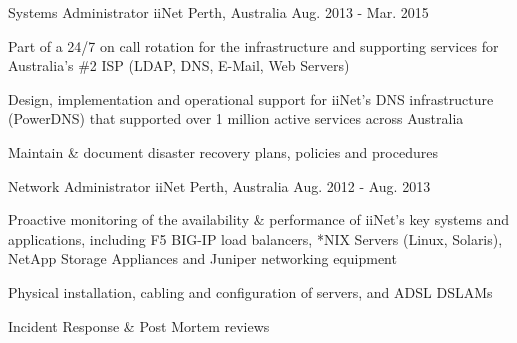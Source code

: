 \begin{cventries}
  \cventry
    {Systems Administrator} %
    {iiNet} %
    {Perth, Australia} %
    {Aug. 2013 - Mar. 2015} %
    {
      \begin{cvitems} %
        \item {Part of a 24/7 on call rotation for the infrastructure and supporting services for Australia's \#2 ISP (LDAP, DNS, E-Mail, Web Servers)}
        \item {Design, implementation and operational support for iiNet's DNS infrastructure (PowerDNS) that supported over 1 million active services across Australia}
        \item {Maintain \& document disaster recovery plans, policies and procedures}
      \end{cvitems}
    }

  \cventry
    {Network Administrator} %
    {iiNet} %
    {Perth, Australia} %
    {Aug. 2012 - Aug. 2013} %
    {
      \begin{cvitems} %
        \item {Proactive monitoring of the availability \& performance of iiNet’s key systems and applications, including F5 BIG-IP load balancers, *NIX Servers (Linux, Solaris), NetApp Storage Appliances and Juniper networking equipment}
        \item {Physical installation, cabling and configuration of servers, and ADSL DSLAMs}
        \item {Incident Response \& Post Mortem reviews}
      \end{cvitems}
    }
\end{cventries}
